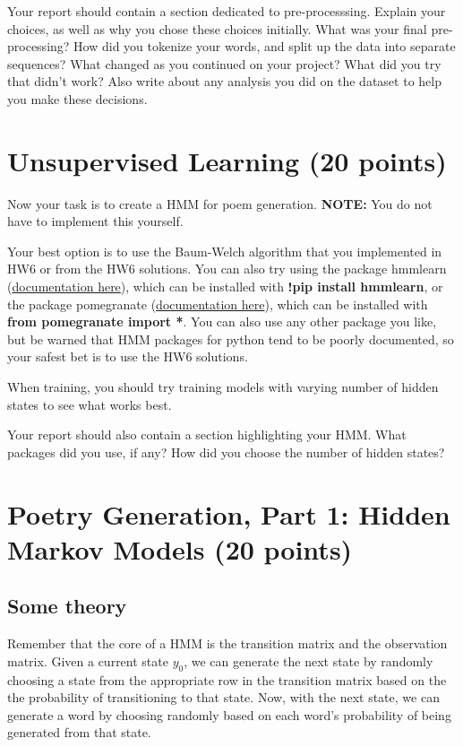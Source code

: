 \begin{report}

    Your report should contain a section dedicated to pre-processsing. Explain your choices, as well as why you chose these choices initially. What was your final pre-processing? How did you tokenize your words, and split up the data into separate sequences? What changed as you continued on your project? What did you try that didn't work? Also write about any analysis you did on the dataset to help you make these decisions.

\end{report}


\section{Unsupervised Learning (20 points)}

Now your task is to create a HMM for poem generation. \textbf{NOTE:} You do not have to implement this yourself.

Your best option is to use the Baum-Welch algorithm that you implemented in HW6 or from the HW6 solutions. You can also try using the package hmmlearn (\href{https://hmmlearn.readthedocs.io/en/latest/}{documentation here}), which can be installed with \textbf{!pip install hmmlearn}, or the package pomegranate  (\href{https://pomegranate.readthedocs.io/en/latest/HiddenMarkovModel.html}{documentation here}), which can be installed with \textbf{from pomegranate import *}. You can also use any other package you like, but be warned that HMM packages for python tend to be poorly documented, so your safest bet is to use the HW6 solutions.

When training, you should try training models with varying number of hidden states to see what works best.

\begin{report}

    Your report should also contain a section highlighting your HMM. What packages did you use, if any? How did you choose the number of hidden states? \newline
\end{report}

\section{Poetry Generation, Part 1: Hidden Markov Models (20 points)}
\subsection{Some theory}
Remember that the core of a HMM is the transition matrix and the observation matrix. Given a current state $y_0$, we can generate the next state by randomly choosing a state from the appropriate row in the transition matrix based on the the probability of transitioning to that state. Now, with the next state, we can generate a word by choosing randomly based on each word's probability of being generated from that state.
